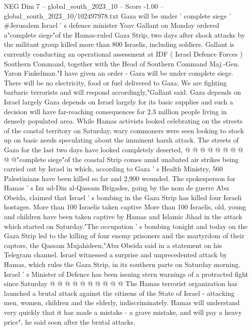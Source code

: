 \begin{textsample}{NEG Dim 7 – global\_south\_2023\_10 – Score -1.00 – global\_south\_2023\_10/102497978.txt}  \label{ex:f7_neg_062}
Gaza will be under ' complete siege ' \#Jerusalem Israel ' s defence minister Yoav Gallant on Monday ordered a"complete siege"of the Hamas-ruled Gaza Strip, two days after shock attacks by the militant group killed more than 800 Israelis, including soldiers.
Gallant is currently conducting an operational assessment at IDF ( Israel Defence Forces ) Southern Command, together with the Head of Southern Command Maj.-Gen.
Yaron Finkelman."I have given an order - Gaza will be under complete siege.
There will be no electricity, food or fuel delivered to Gaza.
We are fighting barbaric terrorists and will respond accordingly,"Gallant said.
Gaza depends on Israel largely Gaza depends on Israel largely for its basic supplies and such a decision will have far-reaching consequences for 2.3 million people living in densely populated area.
While Hamas activists looked celebrating on the streets of the coastal territory on Saturday, wary commoners were seen looking to stock up on basic needs speculating about the imminent harsh attack.
The streets of Gaza for the last two days have looked completely deserted, @ @ @ @ @ @ @ @ @ @"complete siege"of the coastal Strip comes amid unabated air strikes being carried out by Israel in which, according to Gaza ' s Health Ministry, 560 Palestinians have been killed so far and 2,900 wounded.
The spokesperson for Hamas ' s Izz ad-Din al-Qassam Brigades, going by the nom de guerre Abu Obeida, claimed that Israel ' s bombing in the Gaza Strip has killed four Israeli hostages.
More than 100 Israelis taken captive More than 100 Israelis, old, young and children have been taken captive by Hamas and Islamic Jihad in the attack which started on Saturday."The occupation ' s bombing tonight and today on the Gaza Strip led to the killing of four enemy prisoners and the martyrdom of their captors, the Qassam Mujahideen,"Abu Obeida said in a statement on his Telegram channel.
Israel witnessed a surprise and unprecedented attack by Hamas, which rules the Gaza Strip, in its southern parts on Saturday morning.
Israel ' s Minister of Defence has been issuing stern warnings of a protracted fight since Saturday @ @ @ @ @ @ @ @ @ @ The Hamas terrorist organization has launched a brutal attack against the citizens of the State of Israel - attacking men, women, children and the elderly, indiscriminately.
Hamas will understand very quickly that it has made a mistake - a grave mistake, and will pay a heavy price", he said soon after the brutal attacks.

\end{textsample}
